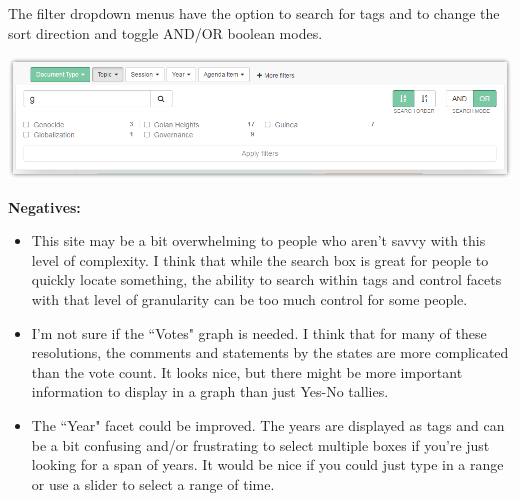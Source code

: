\documentclass{article}
\begin{document}
\noindent The filter dropdown menus have the option to search for tags and to change the sort direction and toggle AND/OR boolean modes.

\noindent\includegraphics[width=\textwidth]{2016-06-09-RightDocs-Filter}

\noindent\textbf{Negatives:}
    \begin{itemize}
    \itemsep0em 
        \item This site may be a bit overwhelming to people who aren't savvy with this level of complexity. I think that while the search box is great for people to quickly locate something, the ability to search within tags and control facets with that level of granularity can be too much control for some people. 
        \item I'm not sure if the ``Votes" graph is needed. I think that for many of these resolutions, the comments and statements by the states are more complicated than the vote count. It looks nice, but there might be more important information to display in a graph than just Yes-No tallies.
        \item The ``Year" facet could be improved. The years are displayed as tags and can be a bit confusing and/or frustrating to select multiple boxes if you're just looking for a span of years. It would be nice if you could just type in a range or use a slider to select a range of time.
    \end{itemize}
    
\end{document}
